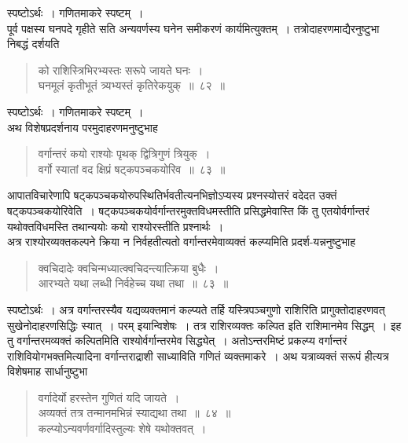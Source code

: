 \documentclass[11pt, openany]{book}
\begin{document}
स्पष्टोऽर्थः~। गणितमाकरे स्पष्टम्~। \\

\vspace{-3mm}
 पूर्व पक्षस्य घनपदे गृहीते सति अन्यवर्णस्य घनेन समीकरणं 
कार्यमित्युक्तम्~। तत्रोदाहरणमाद्यैरनुष्टुभा निबद्धं दर्शयति\textendash 
\begin{quote}
    \ex
     को राशिस्त्रिभिरभ्यस्तः सरूपे जायते घनः~। \\
 घनमूलं कृतीभूतं त्र्यभ्यस्तं कृतिरेकयुक्~॥~८२~॥~
\end{quote}

स्पष्टोऽर्थः~। गणितमाकरे स्पष्टम्~। \\

\vspace{-3mm}
 अथ विशेषप्रदर्शनाय परमुदाहरणमनुष्टुभाह\textendash 
\begin{quote}
    \ex
      वर्गान्तरं कयो राश्योः पृथक् द्वित्रिगुणं त्रियुक्~। \\
 वर्गो स्यातां वद क्षिप्रं षट्कपञ्चकयोरिव~॥~८३~॥~
\end{quote}

आपातविचारेणापि षट्कपञ्चकयोरुपस्थितिर्भवतीत्यनभिज्ञोऽप्यस्य
प्रश्नस्योत्तरं वदेदत उक्तं षट्कपञ्चकयोरिवेति~। षट्कपञ्चकयोर्वर्गान्तरमुक्तविधमस्तीति
प्रसिद्धमेवास्ति किं तु एतयोर्वर्गान्तरं यथोक्तविधमस्ति तथान्ययोः कयो राश्योरस्तीति प्रश्नार्थः~। \\

\vspace{-3mm}
 अत्र राश्योरव्यक्तकल्पने क्रिया न निर्वहतीत्यतो वर्गान्तरमेवाव्यक्तं
कल्प्यमिति प्रदर्श-यन्ननुष्टुभाह\textendash 
\begin{quote}
    \bs
     क्वचिदादेः क्वचिन्मध्यात्क्वचिदन्त्यात्क्रिया बुधैः~। \\
 आरभ्यते यथा लब्धी निर्वहेच्च यथा तथा~॥~८३~॥~
\end{quote}

स्पष्टोऽर्थः~। अत्र वर्गान्तरस्यैव यद्यव्यक्तमानं कल्प्यते तर्हि यस्त्रिपञ्चगुणो 
राशिरिति प्रागुक्तोदाहरणवत् सुखेनोदाहरणसिद्धिः स्यात्~। परम् इयान्विशेषः~। 
तत्र राशिरव्यक्तः कल्पित इति राशिमानमेव सिद्धम्~। इह तु वर्गान्तरमव्यक्तं कल्पितमिति राश्योर्वर्गान्तरमेव सिद्ध्येत्~। अतोऽन्तरमिष्टं प्रकल्प्य 
वर्गान्तरं राशिवियोगभक्तमित्यादिना वर्गान्तराद्राशी साध्याविति गणितं व्यक्तमाकरे~।
\newpage
 अथ यत्राव्यक्तं सरूपं हीत्यत्र विशेषमाह सार्धानुष्टुभा\textendash \begin{quote}
     \bs
       वर्गादेर्यो हरस्तेन गुणितं यदि जायते~। \\
 अव्यक्तं तत्र तन्मानमभिन्नं स्याद्यथा तथा~॥~८४~॥~\\

 \vspace{-5mm}
 कल्प्योऽन्यवर्णवर्गादिस्तुल्यः शेषे यथोक्तवत्~। 
 \end{quote}
\end{document}
